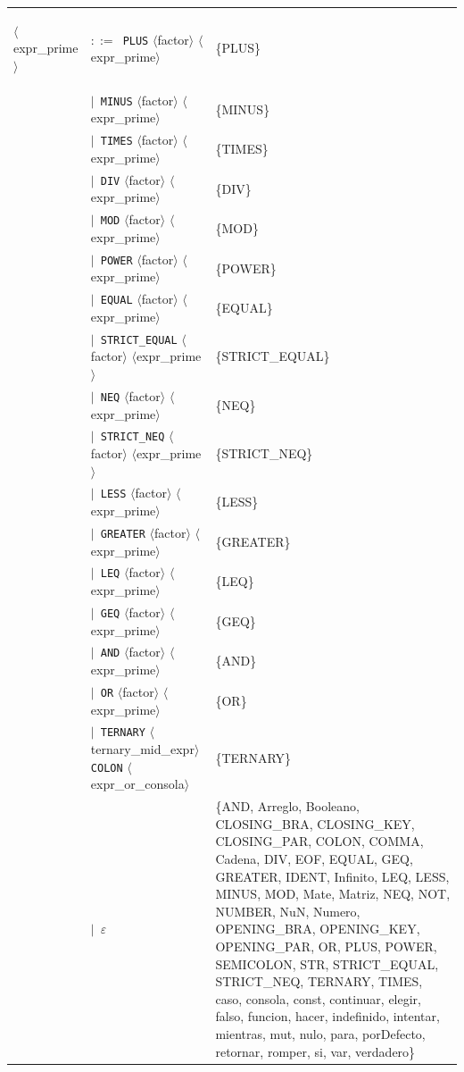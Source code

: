 \documentclass[10pt]{article}
\begin{document}
{\begin{longtable}{@{} p{2.0cm} p{6.9cm} p{6.9cm} @{}}
  \midrule
  \textcolor{ntcolor}{\parbox[t]{1.8cm}{\raggedright$\langle$expr\_\allowbreak{}prime$\rangle$}} & $::=$~\texttt{PLUS} $\langle$factor$\rangle$ $\langle$expr\_prime$\rangle$ & \{PLUS\} \\
   & $\mid$~\texttt{MINUS} $\langle$factor$\rangle$ $\langle$expr\_prime$\rangle$ & \{MINUS\} \\
   & $\mid$~\texttt{TIMES} $\langle$factor$\rangle$ $\langle$expr\_prime$\rangle$ & \{TIMES\} \\
   & $\mid$~\texttt{DIV} $\langle$factor$\rangle$ $\langle$expr\_prime$\rangle$ & \{DIV\} \\
   & $\mid$~\texttt{MOD} $\langle$factor$\rangle$ $\langle$expr\_prime$\rangle$ & \{MOD\} \\
   & $\mid$~\texttt{POWER} $\langle$factor$\rangle$ $\langle$expr\_prime$\rangle$ & \{POWER\} \\
   & $\mid$~\texttt{EQUAL} $\langle$factor$\rangle$ $\langle$expr\_prime$\rangle$ & \{EQUAL\} \\
   & $\mid$~\texttt{STRICT\_EQUAL} $\langle$factor$\rangle$ $\langle$expr\_prime$\rangle$ & \{STRICT\_EQUAL\} \\
   & $\mid$~\texttt{NEQ} $\langle$factor$\rangle$ $\langle$expr\_prime$\rangle$ & \{NEQ\} \\
   & $\mid$~\texttt{STRICT\_NEQ} $\langle$factor$\rangle$ $\langle$expr\_prime$\rangle$ & \{STRICT\_NEQ\} \\
   & $\mid$~\texttt{LESS} $\langle$factor$\rangle$ $\langle$expr\_prime$\rangle$ & \{LESS\} \\
   & $\mid$~\texttt{GREATER} $\langle$factor$\rangle$ $\langle$expr\_prime$\rangle$ & \{GREATER\} \\
   & $\mid$~\texttt{LEQ} $\langle$factor$\rangle$ $\langle$expr\_prime$\rangle$ & \{LEQ\} \\
   & $\mid$~\texttt{GEQ} $\langle$factor$\rangle$ $\langle$expr\_prime$\rangle$ & \{GEQ\} \\
   & $\mid$~\texttt{AND} $\langle$factor$\rangle$ $\langle$expr\_prime$\rangle$ & \{AND\} \\
   & $\mid$~\texttt{OR} $\langle$factor$\rangle$ $\langle$expr\_prime$\rangle$ & \{OR\} \\
   & $\mid$~\texttt{TERNARY} $\langle$ternary\_mid\_expr$\rangle$ \texttt{COLON} $\langle$expr\_or\_consola$\rangle$ & \{TERNARY\} \\
   & $\mid$~$\varepsilon$ & \{AND, Arreglo, Booleano, CLOSING\_BRA, CLOSING\_KEY, CLOSING\_PAR, COLON, COMMA, Cadena, DIV, EOF, EQUAL, GEQ, GREATER, IDENT, Infinito, LEQ, LESS, MINUS, MOD, Mate, Matriz, NEQ, NOT, NUMBER, NuN, Numero, OPENING\_BRA, OPENING\_KEY, OPENING\_PAR, OR, PLUS, POWER, SEMICOLON, STR, STRICT\_EQUAL, STRICT\_NEQ, TERNARY, TIMES, caso, consola, const, continuar, elegir, falso, funcion, hacer, indefinido, intentar, mientras, mut, nulo, para, porDefecto, retornar, romper, si, var, verdadero\} \\

\end{longtable}}
\end{document}
